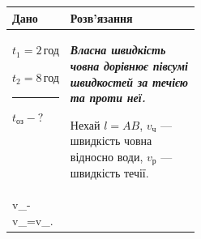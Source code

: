 \documentclass[12pt,a4paper]{article}
\newcommand{\target}[1]{\par\rule{\linewidth}{0.3pt}\par $#1-?$}
\newcommand{\why}[1]{\textbf{\textit{#1}}\par}
\newenvironment{solutiontwo}{\small\begin{tabular}{|>{\raggedright\arraybackslash}p{0.27\linewidth}|>{\raggedright\arraybackslash}p{\dimexpr0.73\linewidth-4\tabcolsep-3\arrayrulewidth\relax}|}\hline
\textbf{Дано}&\textbf{Розв'язання}\\\hline}{\\\hline\end{tabular}\par}
\begin{document}
\begin{solutiontwo}
$t_1=2\,\text{год}$\par
$t_2=8\,\text{год}$
\target{t_{\text{оз}}}

&

\why{Власна швидкість човна дорівнює півсумі швидкостей за течією та проти неї.}
Нехай $l=AB$, $v_{\text{ч}}$ --- швидкість човна відносно води, $v_{\text{р}} $ --- швидкість течії.
\[
\begin{cases}
v_{\text{ч}}+v_{\text{р}}=v_{\text{за}},\\
v_{\text{ч}}-v_{\text{р}}=v_{\text{проти}}.
\end{cases}
\]
Окремо швидкості відносно берега:
\[v_{\text{за}}=\frac{l}{t_1},\qquad v_{\text{проти}}=\frac{l}{t_2}.\]

Додаємо рівняння системи: $2v_{\text{ч}}=v_{\text{за}}+v_{\text{проти}}$. Підставляємо знайдені вирази:
\[2v_{\text{ч}}=\frac{l}{t_1}+\frac{l}{t_2},\]
\[v_{\text{ч}}=\frac{l(t_1+t_2)}{2t_1t_2}.\]
\why{Для проходження відстані $AB$ в озері потрібен час $l/v_{\text{ч}}$.}
\[t_{\text{оз}}=\frac{l}{v_{\text{ч}}}=\frac{2t_1t_2}{t_1+t_2}.\]
\[t_{\text{оз}}=\frac{2\cdot2\cdot8}{2+8}=3{,}2\,\text{год}.\]
Дробова частина години:
\[0{,}2\cdot60=12\,\text{хв}.\]
\textbf{Відповідь:} $3\,\text{год}\,12\,\text{хв}$ на відстань $AB$.
\par Якщо розглядати весь шлях туди й назад ($2l$), час в озері дорівнює $6{,}4\,\text{год}=6\,\text{год}\,24\,\text{хв}$.
\end{solutiontwo}
\end{document}
